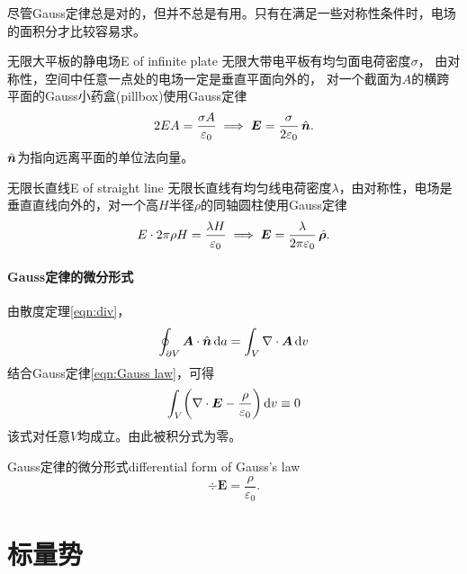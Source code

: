 \begin{remark}
    尽管Gauss定律总是对的，但并不总是有用。只有在满足一些对称性条件时，电场的面积分才比较容易求。%
\end{remark}

\begin{example}{无限大平板的静电场}{E of infinite plate}
    无限大带电平板有均匀面电荷密度$\sigma$，%
    由对称性，空间中任意一点处的电场一定是垂直平面向外的，
    对一个截面为$A$的横跨平面的Gauss小药盒(pillbox)使用Gauss定律
    \[
        2EA=\frac{\sigma A}{\varepsilon_0}\implies\bm E=\frac\sigma{2\varepsilon_0}\mathop{}\!\hat{\bm{n}}.
    \]
    $\mathop{}\!\hat{\bm{n}}$为指向远离平面的单位法向量。
\end{example}
\begin{example}{无限长直线}{E of straight line}
    无限长直线有均匀线电荷密度$\lambda$，由对称性，电场是垂直直线向外的，对一个高$H$半径$\rho$的同轴圆柱使用Gauss定律
    \[
        E\cdot 2\pi\rho H=\frac{\lambda H}{\varepsilon_0}\implies\bm E=\frac{\lambda}{2\pi\varepsilon_0}\mathop{}\!\hat{\bm{\rho}}.
    \]
\end{example}

\paragraph{Gauss定律的微分形式}

由散度定理\eqref{eqn:div}，
\[
    \oint_{\partial V}\bm A\cdot\mathop{}\!\hat{\bm{n}}\mathop{}\!\mathrm{d} a=\int_V\nabla\cdot\bm A\mathop{}\!\mathrm{d} v
\]
结合Gauss定律\eqref{eqn:Gauss law}，可得
\[
    \int_V\biggl(\nabla\cdot\bm E-\frac\rho{\varepsilon_0}\biggr)\mathop{}\!\mathrm{d} v\equiv 0
\]
该式对任意$V$均成立。由此被积分式为零。
\begin{theorem}{Gauss定律的微分形式}{differential form of Gauss's law}
    \begin{equation}
        \label{eqn:divE}
        \div\bm E=\frac\rho{\varepsilon_0}.
    \end{equation}
\end{theorem}

\section{标量势}


